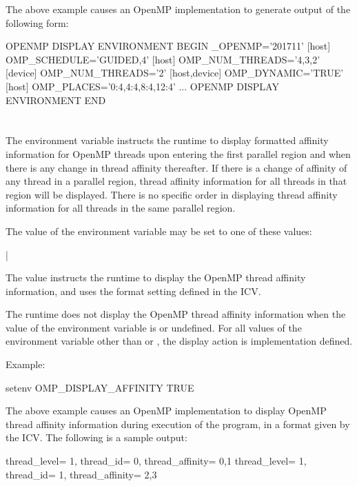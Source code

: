 The above example causes an OpenMP implementation to generate output of the
following form:

\begin{ompEnv}
OPENMP DISPLAY ENVIRONMENT BEGIN
  _OPENMP='201711'
  [host] OMP_SCHEDULE='GUIDED,4'
  [host] OMP_NUM_THREADS='4,3,2'
  [device] OMP_NUM_THREADS='2'
  [host,device] OMP_DYNAMIC='TRUE'
  [host] OMP_PLACES='{0:4},{4:4},{8:4},{12:4}'
  ...
OPENMP DISPLAY ENVIRONMENT END
\end{ompEnv}


\section{}
\label{sec:OMP_DISPLAY_AFFINITY}
The  environment variable instructs the runtime to display formatted
affinity information for OpenMP threads upon entering the first parallel region
 and when there is any change in thread affinity thereafter.
If there is a change of affinity of any thread in a parallel region, thread affinity information for all threads
in that region will be displayed.  There is no specific order in displaying thread affinity information
for all threads in the same parallel region.

The value of the  environment variable may be set to one of these
values:

{|}


The  value instructs the runtime to display the OpenMP thread affinity information, and uses the
format setting defined in the  ICV.

The runtime does not display the OpenMP thread affinity information when the value of the 
environment variable is  or undefined. For all values of the environment
variable other than  or , the display action is implementation defined.

Example:
\begin{ompEnv}
setenv OMP_DISPLAY_AFFINITY TRUE
\end{ompEnv}

The above example causes an OpenMP implementation to display OpenMP thread affinity information during execution of
the program, in a format given by the  ICV.  The following is a sample output:
\begin{ompSyntax}
thread_level=   1,   thread_id=   0,   thread_affinity=    0,1
thread_level=   1,   thread_id=   1,   thread_affinity=    2,3
\end{ompSyntax}


